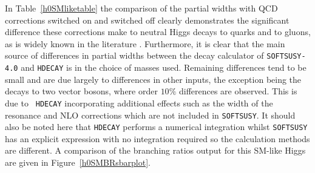 \documentclass[final,3p,times,pdflatex]{elsarticle}
\begin{document}
In Table~\ref{h0SMliketable} the comparison of the partial widths with QCD corrections
switched on and switched off clearly demonstrates the significant difference
these corrections make to neutral Higgs decays to quarks and to gluons, as is
widely known in the literature
\cite{Djouadi:1996,Djouadi:1995,Spira:1998,Djouadi:2008}. Furthermore, it is
clear that the main source of differences in partial widths between the decay
calculator of {\tt SOFTSUSY-4.0} and {\tt HDECAY} is in the choice of masses
used. Remaining differences tend to be small and are due largely to
differences in other inputs, the exception being the decays to two vector
bosons, where order $10\%$ differences are observed. This is due to {\tt
  HDECAY} incorporating additional effects such as the width of the resonance
and NLO corrections which are not included in {\tt SOFTSUSY}. It
should also be noted here that {\tt HDECAY} performs a numerical integration
whilst {\tt SOFTSUSY} has an explicit expression with no integration required
so the calculation methods are different. A comparison of the branching ratios
output for this SM-like Higgs are given in Figure~\ref{h0SMBRsbarplot}. 
\end{document}
